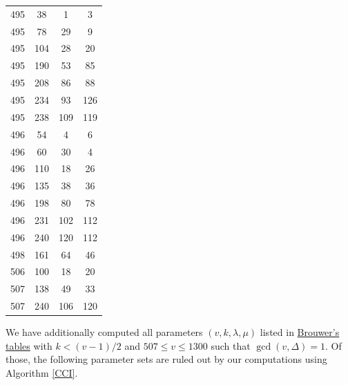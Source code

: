\documentclass[12pt]{amsproc} %
\theoremstyle{definition}\newtheorem{defn}[thm]{Definition}
\theoremstyle{definition}\newtheorem{rem}[thm]{Remark}
\theoremstyle{definition}\newtheorem{ex}[thm]{Example}
\renewcommand\le{\leqslant}
\begin{document}
\begin{table}[ht]
\begin{minipage}{0.25\textwidth}
\begin{tabular}{c|c|c|c}
		495 & 38 & 1 & 3 \\ 
		495 & 78 & 29 & 9 \\ 
		495 & 104 & 28 & 20 \\ 
		495 & 190 & 53 & 85 \\ 
		495 & 208 & 86 & 88 \\ 
		495 & 234 & 93 & 126 \\ 
		495 & 238 & 109 & 119 \\ 
		496 & 54 & 4 & 6 \\ 
		496 & 60 & 30 & 4 \\ 
		496 & 110 & 18 & 26 \\ 
		496 & 135 & 38 & 36 \\ 
		496 & 198 & 80 & 78 \\
		496 & 231 & 102 & 112 \\
		496 & 240 & 120 & 112 \\
		498 & 161 & 64 & 46 \\
		506 & 100 & 18 & 20 \\
		507 & 138 & 49 & 33 \\
		507 & 240 & 106 & 120 \\
        \end{tabular}
    \end{minipage}
\end{table}

\FloatBarrier

We have additionally computed all parameters $(v, k, \lambda, \mu)$ listed in \hypertarget{brouwer-table}{\href{https://aeb.win.tue.nl/graphs/srg/srgtab.html}{Brouwer's tables}} with $k < (v-1)/2$ and $507 \le v \le 1300$ such that $\gcd(v, \Delta) = 1$. Of those, the following parameter sets are ruled out by our computations using Algorithm \ref{CCI}.
\end{document}
